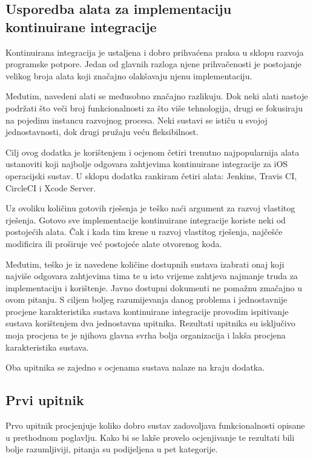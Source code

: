 \documentclass[times, utf8, diplomski, numeric]{fer}
\begin{document}
\begin{appendices}

\chapter{Usporedba alata za implementaciju kontinuirane integracije} \label{header:dodatak_usporedba_alata_za_kontinuiranu_integraciju}

Kontinuirana integracija je ustaljena i dobro prihvaćena praksa u sklopu razvoja programske potpore. Jedan od glavnih razloga njene prihvačenosti je postojanje velikog broja alata koji značajno olakšavaju njenu implementaciju.

Međutim, navedeni alati se međusobno značajno razlikuju. Dok neki alati nastoje podržati što veči broj funkcionalnosti za što više tehnologija, drugi se fokusiraju na pojedinu instancu razvojnog procesa. Neki sustavi se ističu u svojoj jednostavnosti, dok drugi pružaju veću fleksibilnost.

Cilj ovog dodatka je korištenjem i ocjenom četiri trenutno najpopularnija alata ustanoviti koji najbolje odgovara zahtjevima kontinuirane integracije za iOS operacijski sustav. U sklopu dodatka rankiram četiri alata: Jenkins, Travis CI, CircleCI i Xcode Server.

Uz ovoliku količinu gotovih rješenja je teško naći argument za razvoj vlastitog rješenja. Gotovo sve implementacije kontinuirane integracije koriste neki od postojećih alata. Čak i kada tim krene u razvoj vlastitog rješenja, najčešće modificira ili proširuje već postojeće alate otvorenog koda.

Međutim, teško je iz navedene količine dostupnih sustava izabrati onaj koji najviše odgovara zahtjevima tima te u isto vrijeme zahtjeva najmanje truda za implementaciju i korištenje. Javno dostupni dokumenti ne pomažnu zmačajno u ovom pitanju. S ciljem boljeg razumijevanja danog problema i jednostavnije procjene karakteristika sustava kontinuirane integracije provodim ispitivanje sustava korištenjem dva jednostavna upitnika. Rezultati upitnika su isključivo moja procjena te je njihova glavna svrha bolja organizacija i lakša procjena karakteristika sustava.

Oba upitnika se zajedno s ocjenama sustava nalaze na kraju dodatka.

\section{Prvi upitnik}
Prvo upitnik procjenjuje koliko dobro sustav zadovoljava funkcionalnosti opisane u prethodnom poglavlju. Kako bi se lakše provelo ocjenjivanje te rezultati bili bolje razumljiviji, pitanja su podijeljena u pet kategorije.


\end{appendices}
\end{document}

